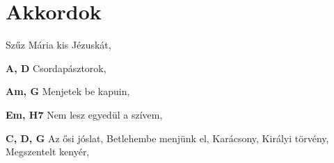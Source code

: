 \section*{Akkordok}
\begin{multicols}{2}
\begin{minipage}{\textwidth}
\textbf{}\newline
\textbullet\hspace{1 mm}Szűz Mária kis Jézuskát, \pageref{SzC5B1zMC3A1riakisJC3A9zuskC3A1t}\newline

\end{minipage}
\begin{minipage}{\textwidth}
\textbf{A, D}\newline
\textbullet\hspace{1 mm}Csordapásztorok, \pageref{CsordapC3A1sztorok}\newline

\end{minipage}
\begin{minipage}{\textwidth}
\textbf{Am, G}\newline
\textbullet\hspace{1 mm}Menjetek be kapuin, \pageref{Menjetekbekapuin}\newline

\end{minipage}
\begin{minipage}{\textwidth}
\textbf{Em, H7}\newline
\textbullet\hspace{1 mm}Nem lesz egyedül a szívem, \pageref{NemleszegyedC3BClaszC3ADvem}\newline

\end{minipage}
\begin{minipage}{\textwidth}
\textbf{C, D, G}\newline
\textbullet\hspace{1 mm}Az ősi jóslat, \pageref{AzC591sijC3B3slat}\newline
\textbullet\hspace{1 mm}Betlehembe menjünk el, \pageref{BetlehembemenjC3BCnkel}\newline
\textbullet\hspace{1 mm}Karácsony, \pageref{KarC3A1csony}\newline
\textbullet\hspace{1 mm}Királyi törvény, \pageref{KirC3A1lyitC3B6rvC3A9ny}\newline
\textbullet\hspace{1 mm}Megszentelt kenyér, \pageref{MegszenteltkenyC3A9r}\newline


\end{minipage}
\end{multicols}

